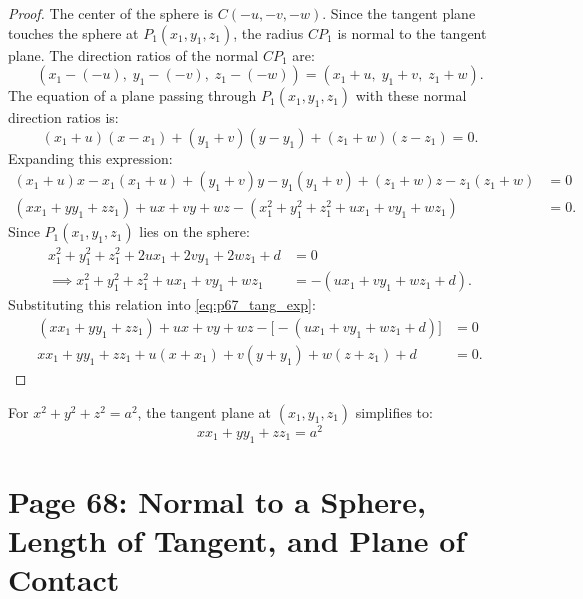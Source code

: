 \begin{proof}
The center of the sphere is $C(-u, -v, -w)$.
Since the tangent plane touches the sphere at $P_1(x_1, y_1, z_1)$, the radius $C P_1$ is normal to the tangent plane.
The direction ratios of the normal $C P_1$ are:
\begin{equation}
    (x_1 - (-u), \; y_1 - (-v), \; z_1 - (-w)) = (x_1 + u, \; y_1 + v, \; z_1 + w).
\end{equation}
The equation of a plane passing through $P_1(x_1, y_1, z_1)$ with these normal direction ratios is:
\begin{equation}
    (x_1 + u)(x - x_1) + (y_1 + v)(y - y_1) + (z_1 + w)(z - z_1) = 0.
\end{equation}
Expanding this expression:
\begin{align}
    (x_1 + u)x - x_1(x_1 + u) + (y_1 + v)y - y_1(y_1 + v) + (z_1 + w)z - z_1(z_1 + w) &= 0 \nonumber\\
    (x x_1 + y y_1 + z z_1) + u x + v y + w z - (x_1^2 + y_1^2 + z_1^2 + u x_1 + v y_1 + w z_1) &= 0. \label{eq:p67_tang_exp}
\end{align}
Since $P_1(x_1, y_1, z_1)$ lies on the sphere:
\begin{align}
    x_1^2 + y_1^2 + z_1^2 + 2ux_1 + 2vy_1 + 2wz_1 + d &= 0 \nonumber\\
    \implies x_1^2 + y_1^2 + z_1^2 + ux_1 + vy_1 + wz_1 &= -(ux_1 + vy_1 + wz_1 + d).
\end{align}
Substituting this relation into \eqref{eq:p67_tang_exp}:
\begin{align}
    (x x_1 + y y_1 + z z_1) + ux + vy + wz - \bigl[-(ux_1 + vy_1 + wz_1 + d)\bigr] &= 0 \nonumber\\
    x x_1 + y y_1 + z z_1 + u(x + x_1) + v(y + y_1) + w(z + z_1) + d &= 0.
\end{align}
\end{proof}

\begin{notebox}
For $x^2 + y^2 + z^2 = a^2$, the tangent plane at $(x_1, y_1, z_1)$ simplifies to:
\begin{equation}
    \boxed{x x_1 + y y_1 + z z_1 = a^2}
\end{equation}
\end{notebox}

\section{Page 68: Normal to a Sphere, Length of Tangent, and Plane of Contact}
\label{sec:page68}

